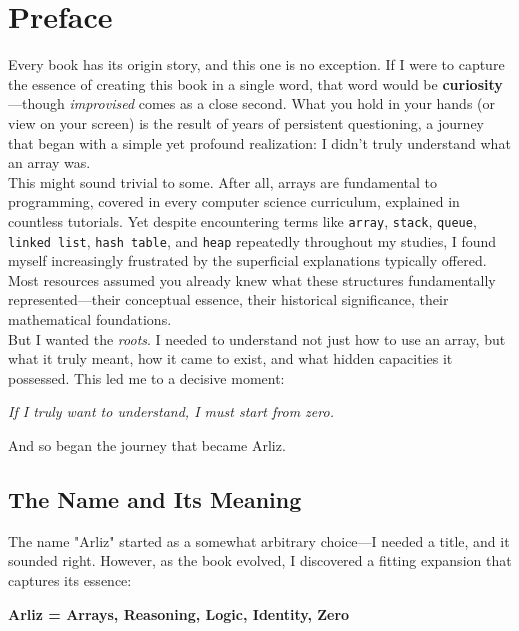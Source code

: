 \chapter{Preface}

Every book has its origin story, and this one is no exception. If I were to capture the essence of creating this book in a single word, that word would be \textbf{curiosity}—though \emph{improvised} comes as a close second. What you hold in your hands (or view on your screen) is the result of years of persistent questioning, a journey that began with a simple yet profound realization: I didn't truly understand what an array was.\\

This might sound trivial to some. After all, arrays are fundamental to programming, covered in every computer science curriculum, explained in countless tutorials. Yet despite encountering terms like \texttt{array}, \texttt{stack}, \texttt{queue}, \texttt{linked list}, \texttt{hash table}, and \texttt{heap} repeatedly throughout my studies, I found myself increasingly frustrated by the superficial explanations typically offered. Most resources assumed you already knew what these structures fundamentally represented—their conceptual essence, their historical significance, their mathematical foundations.\\

But I wanted the \emph{roots}. I needed to understand not just how to use an array, but what it truly meant, how it came to exist, and what hidden capacities it possessed. This led me to a decisive moment:

\begin{center}
	\emph{If I truly want to understand, I must start from zero.}
\end{center}

And so began the journey that became Arliz.\\

\section*{The Name and Its Meaning}

The name "Arliz" started as a somewhat arbitrary choice—I needed a title, and it sounded right. However, as the book evolved, I discovered a fitting expansion that captures its essence:

\begin{center}
	\textbf{Arliz = Arrays, Reasoning, Logic, Identity, Zero}
\end{center}

